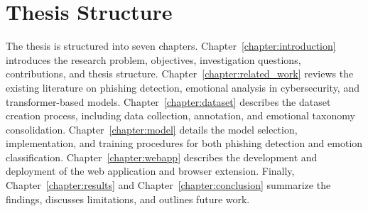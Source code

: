 \section{Thesis Structure}
The thesis is structured into seven chapters. Chapter~\ref{chapter:introduction} introduces the research problem, objectives, investigation questions, contributions, and thesis structure. Chapter~\ref{chapter:related_work} reviews the existing literature on phishing detection, emotional analysis in cybersecurity, and transformer-based models. Chapter~\ref{chapter:dataset} describes the dataset creation process, including data collection, annotation, and emotional taxonomy consolidation. Chapter~\ref{chapter:model} details the model selection, implementation, and training procedures for both phishing detection and emotion classification. Chapter~\ref{chapter:webapp} describes the development and deployment of the web application and browser extension. Finally, Chapter~\ref{chapter:results} and Chapter~\ref{chapter:conclusion} summarize the findings, discusses limitations, and outlines future work.